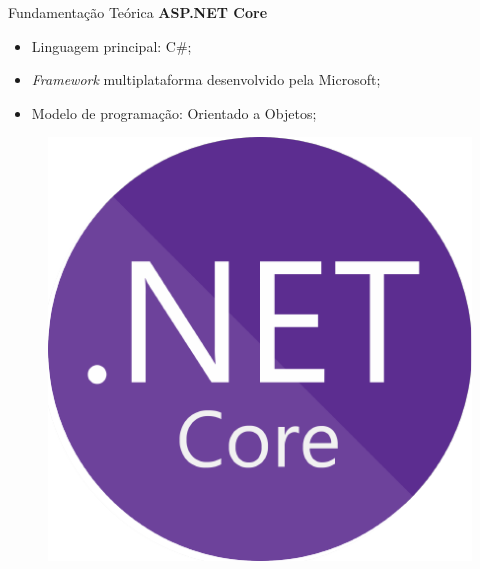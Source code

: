 \documentclass{libs/ufc_format}
\begin{document}
\begin{frame}{Fundamentação Teórica}
    \textbf{ASP.NET Core}\nocite{dotnet}\let\thefootnote\relax{}
    \begin{multicols}{2}
        \begin{itemize}
            \item Linguagem principal: C\#;
            \item \textit{Framework} multiplataforma desenvolvido pela Microsoft;
            \item Modelo de programação: Orientado a Objetos;
        \end{itemize}
        \begin{figure}[H]
            \centering
            \includegraphics[width=0.7\linewidth]{figuras/logo-dotnet.pdf}
            \captionsetup{justification=centering}
            \label{fig:modelo-rest-api}
        \end{figure}
    \end{multicols}
\end{frame}
\end{document}
